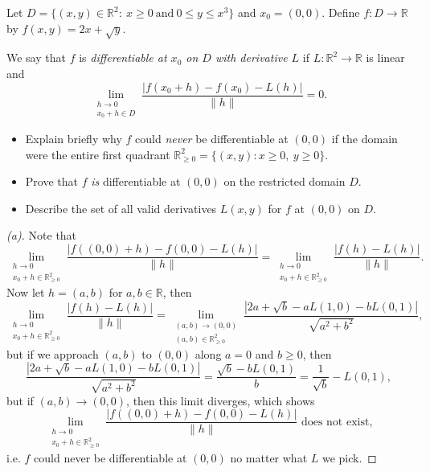 \begin{problem}
Let $D=\{(x,y)\in\mathbb{R}^2:\ x\ge 0\ \text{and}\ 0\le y\le x^3\}$ and $x_0=(0,0)$.
Define $f:D\to\mathbb{R}$ by $f(x,y)=2x+\sqrt{y}$.

We say that $f$ is \emph{differentiable at $x_0$ on $D$ with derivative $L$} if
$L:\mathbb{R}^2\to\mathbb{R}$ is linear and
\[
\lim_{\substack{h\to 0\\ x_0+h\in D}}
\frac{|f(x_0+h)-f(x_0)-L(h)|}{\|h\|}=0.
\]

\begin{itemize}
\item[(a)] Explain briefly why $f$ could \emph{never} be differentiable at $(0,0)$ if the domain were the entire first quadrant $\mathbb{R}^2_{\ge 0}=\{(x,y):x\ge 0,\ y\ge 0\}$.

\item[(b)] Prove that $f$ \emph{is} differentiable at $(0,0)$ on the restricted domain $D$.

\item[(c)] Describe the set of all valid derivatives $L(x,y)$ for $f$ at $(0,0)$ on $D$.
\end{itemize}

\end{problem}

\begin{proof}[(a)]
    Note that 
    \[
        \lim_{\substack{h \to 0 \\ x_0 + h \in \mathbb{R} ^2_{\ge 0}}} \frac{\left\vert f((0, 0) + h) - f(0, 0) - L(h) \right\vert }{\lVert h \rVert } = \lim_{\substack{h \to 0 \\ x_0 + h \in \mathbb{R} ^2_{\ge 0}}} \frac{\vert f(h) - L(h) \vert }{\lVert h \rVert }.
    \]
    Now let \(h = (a, b)\) for \(a, b \in \mathbb{R} \), then 
    \[
        \lim_{\substack{h \to 0 \\ x_0 + h \in \mathbb{R} ^2_{\ge 0}}} \frac{\vert f(h) - L(h) \vert }{\lVert h \rVert } = \lim_{\substack{(a, b) \to (0, 0) \\ (a, b) \in \mathbb{R} ^2_{\ge 0}}} \frac{\left\vert 2a + \sqrt{b} - a L(1, 0) - bL(0, 1)  \right\vert }{\sqrt{a^2 + b^2} },
    \]  
    but if we approach \((a, b)\) to \((0, 0)\)  along \(a = 0\) and \(b \ge 0\), then 
    \[
        \frac{\left\vert 2a + \sqrt{b} - a L(1, 0) - bL(0, 1)  \right\vert }{\sqrt{a^2 + b^2} } = \frac{\sqrt{b} - b L(0, 1) }{b} = \frac{1}{\sqrt{b} } - L(0, 1),
    \] 
    but if \((a, b) \to (0, 0)\), then this limit diverges, which shows 
    \[
        \lim_{\substack{h \to 0 \\ x_0 + h \in \mathbb{R} ^2_{\ge 0}}} \frac{\left\vert f((0, 0) + h) - f(0, 0) - L(h) \right\vert }{\lVert h \rVert } \text{ does not exist,} 
    \]
    i.e. \(f\) could never be differentiable at \((0, 0)\) no matter what \(L\) we pick.   
\end{proof}

